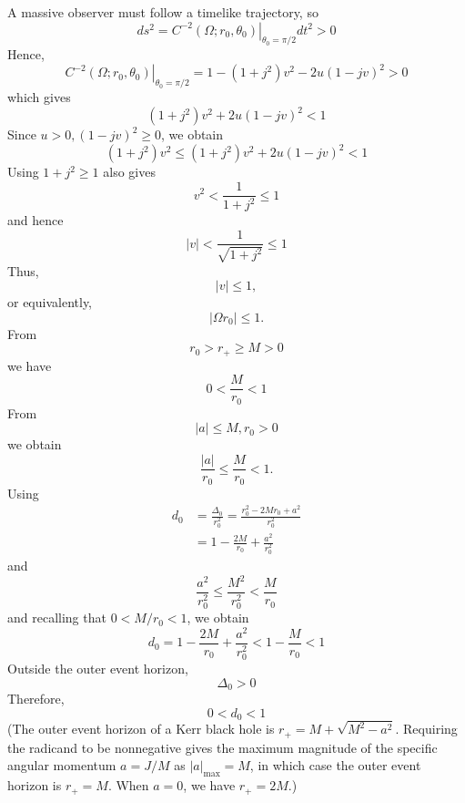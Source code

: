\documentclass[english]{article}
\begin{document}
 A massive observer must follow a timelike trajectory, so 
\[
ds^{2}=\left.C^{-2}\left(\Omega;r_{0},\theta_{0}\right)\right|_{\theta_{0}=\pi/2}dt^{2}>0
\]
 Hence, 
\[
\left.C^{-2}\left(\Omega;r_{0},\theta_{0}\right)\right|_{\theta_{0}=\pi/2}=1-\left(1+j^{2}\right)v^{2}-2u\left(1-jv\right)^{2}>0
\]
 which gives 
\[
\left(1+j^{2}\right)v^{2}+2u\left(1-jv\right)^{2}<1
\]
 Since $u>0,\left(1-jv\right)^{2}\geq0$, we obtain 
\[
\left(1+j^{2}\right)v^{2}\leq\left(1+j^{2}\right)v^{2}+2u\left(1-jv\right)^{2}<1
\]
 Using $1+j^{2}\geq1$ also gives 
\[
v^{2}<\frac{1}{1+j^{2}}\leq1
\]
 and hence 
\[
|v|<\frac{1}{\sqrt{1+j^{2}}}\leq1
\]
 Thus, 
\[
|v|\leq1,
\]
 or equivalently, 
\[
|\Omega r_{0}|\leq1.
\]
 From 
\[
r_{0}>r_{+}\geq M>0
\]
 we have 
\[
0<\frac{M}{r_{0}}<1
\]
 From 
\[
|a|\leq M,r_{0}>0
\]
 we obtain 
\[
\frac{|a|}{r_{0}}\leq\frac{M}{r_{0}}<1.
\]
 Using 
\begin{align*}
d_{0} & =\frac{\Delta_{0}}{r^{2}_{0}}=\frac{r^{2}_{0}-2Mr_{0}+a^{2}}{r^{2}_{0}}\\
 & =1-\frac{2M}{r_{0}}+\frac{a^{2}}{r^{2}_{0}}
\end{align*}
 and 
\[
\frac{a^{2}}{r^{2}_{0}}\leq\frac{M^{2}}{r^{2}_{0}}<\frac{M}{r_{0}}
\]
 and recalling that $0<M/r_{0}<1$, we obtain 
\[
d_{0}=1-\frac{2M}{r_{0}}+\frac{a^{2}}{r^{2}_{0}}<1-\frac{M}{r_{0}}<1
\]
 Outside the outer event horizon, 
\[
\Delta_{0}>0
\]
 Therefore, 
\[
0<d_{0}<1
\]
 (The outer event horizon of a Kerr black hole is $r_{+}=M+\sqrt{M^{2}-a^{2}}$.
Requiring the radicand to be nonnegative gives the maximum magnitude
of the specific angular momentum $a=J/M$ as $|a|_{\max}=M$, in which
case the outer event horizon is $r_{+}=M$. When $a=0$, we have $r_{+}=2M$.)
\end{document}
